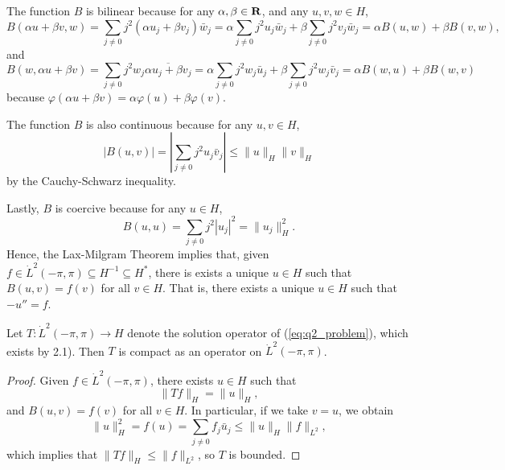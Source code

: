 \documentclass{homework}
\begin{document}
\begin{arabicparts}
		The function $B$ is bilinear because for any $\alpha,\beta \in \textnormal{\bf R}$, and any $u,v,w\in H$,
		\begin{equation}
			B(\alpha u + \beta v, w) = \sum_{j\ne0}j^2(\alpha u_j + \beta v_j)\bar{w}_j = \alpha\sum_{j\ne0}j^2u_j\bar{w}_j + \beta\sum_{j\ne0}j^2v_j\bar{w}_j = \alpha B(u,w) + \beta B(v,w),
		\end{equation}
		and
		\begin{equation}
			B(w, \alpha u + \beta v) =\sum_{j\ne0}j^2w_j\overline{\alpha u_j + \beta v_j} = \alpha\sum_{j\ne 0}j^2w_j\bar{u}_j + \beta \sum_{j\ne0}j^2w_j\bar{v}_j = \alpha B(w,u) + \beta B(w,v)
		\end{equation}
		because $\varphi(\alpha u + \beta v) = \alpha\varphi(u) + \beta\varphi(v)$.
		
		The function $B$ is also continuous because for any $u,v \in H$,
		\begin{equation}
			|B(u,v)| = \left|\sum_{j\ne0}j^2u_j\bar{v}_j\right| \le \lVert u\rVert_H \lVert v\rVert_H
		\end{equation}
		by the Cauchy-Schwarz inequality.
		
		Lastly, $B$ is coercive because for any $u \in H$,
		\begin{equation}
			B(u,u) = \sum_{j\ne0}j^2|u_j|^2 = \lVert u_j\rVert_H^2.
		\end{equation}
		Hence, the Lax-Milgram Theorem implies that, given $f \in \dot{L}^2(-\pi,\pi) \subseteq H^{-1} \subseteq H^*$, there is exists a unique $u \in H$ such that $B(u,v) = f(v)$ for all $v \in H$. That is, there exists a unique $u \in H$ such that $-u'' = f$.
		
		\questionpart Let $T : \dot{L}^2(-\pi, \pi) \to H$ denote the solution operator of (\ref{eq:q2_problem}), which exists by 2.1). Then $T$ is compact as an operator on $\dot{L}^2(-\pi,\pi)$.
		
		\begin{proof}
			Given $f \in \dot{L}^2(-\pi,\pi)$, there exists $u \in H$ such that
			\begin{equation}
				\lVert Tf \rVert_H = \lVert u \rVert_H,
			\end{equation}
			and $B(u,v) = f(v)$ for all $v \in H$. In particular, if we take $v = u$, we obtain
			\begin{equation}
				\lVert u \rVert_H^2 = f(u) = \sum_{j\ne 0}f_j\bar{u}_j \le \lVert u \rVert_H \lVert f\rVert_{L^2},
			\end{equation} 
			which implies that $\lVert Tf\rVert_H \le \lVert f\rVert_{L^2}$, so $T$ is bounded.
			

\end{proof}
\end{arabicparts}
\end{document}
